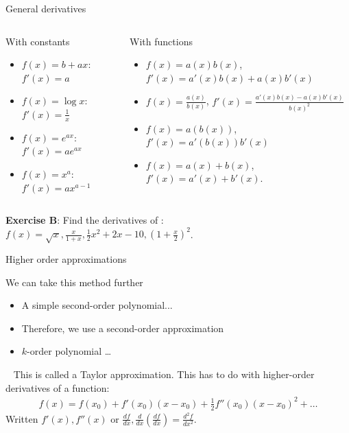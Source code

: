 \documentclass[handout]{beamer}
\begin{document}
\begin{frame}{General derivatives}

\begin{columns}
\footnotesize
\begin{column}{0.5\textwidth}
   With constants
   \begin{itemize}
   		\item $f(x) = b + ax$: $f'(x) = a$
		\item $f(x) = \log x$: $f'(x) = \frac{1}{x}$
		\item $f(x) = e^{ax}$: $f'(x) = ae^{ax}$ 
		\item $f(x) = x^a$: $f'(x) = a x^{a-1}$
   \end{itemize}
\end{column}
\begin{column}{0.5\textwidth}  %
	With functions
	\begin{itemize}
		\item $f(x) = a(x)b(x)$, $f'(x) = a'(x)b(x) + a(x)b'(x)$
		\item $f(x) = \frac{a(x)}{b(x)}$, $f'(x) = \frac{a'(x)b(x) - a(x)b'(x)}{b(x)^2}$
		\item $f(x) = a(b(x))$, $f'(x) = a'(b(x))b'(x)$
		\item $f(x) = a(x) + b(x)$, $f'(x) = a'(x) + b'(x)$. 
	\end{itemize}
\end{column}
\end{columns}
\vspace{0.5in}
\textbf{Exercise B}: Find the derivatives of : $f(x)=\sqrt{x},\frac{x}{1+x},\frac{1}{2}x^2 + 2x-10,(1+\frac{x}{2})^2$.
\end{frame}


\begin{frame}{Higher order approximations}

We can take this method further
\begin{itemize}
\item A simple second-order polynomial...
\item Therefore, we use a second-order approximation
\item $k$-order polynomial \ldots
\end{itemize}\
\pause
This is called a Taylor approximation. This has to do with higher-order derivatives of a function:
\begin{eqnarray*}
	f(x) = f(x_0) + f'(x_0)(x-x_0) +\frac{1}{2}f''(x_0)(x-x_0)^2 + \ldots 
\end{eqnarray*}
Written $f'(x), f''(x)$ or $\frac{d f}{d x},\frac{d}{d x}(\frac{d f}{d x}) = \frac{d^2 f}{d x^2} $.
\end{frame}
\end{document}

